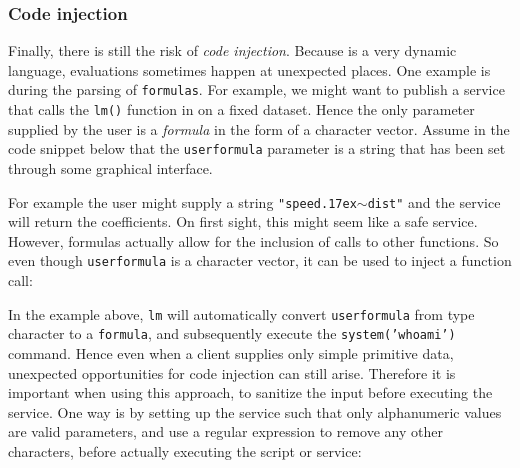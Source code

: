 \subsubsection{Code injection}

Finally, there is still the risk of \emph{code injection}. Because \R is a very
dynamic language, evaluations sometimes happen at unexpected places. One example
is during the parsing of \texttt{formulas}. For example, we might want to
publish a service that calls the \texttt{lm()} function in \R on a fixed
dataset. Hence the only parameter supplied by the user is a \emph{formula} in
the form of a character vector. Assume in the code snippet below that the
 \texttt{userformula} parameter is a string that has been set through some
graphical interface.

\begin{knitrout}\mycodesize
{}\color{fgcolor}\begin{kframe}
\begin{alltt}
\hlstd{(}  
\end{alltt}
\end{kframe}
\end{knitrout}


For example the user might supply a string
\texttt{"speed{\raise.17ex\hbox{$\scriptstyle\sim$}}dist"} and the service
will return the coefficients. On first sight, this might seem like a safe
service. However, formulas actually allow for the inclusion of calls to other
functions. So even though \texttt{userformula} is a character vector, it can be
used to inject a function call:

\begin{knitrout}\mycodesize
{}\color{fgcolor}\begin{kframe}
\begin{alltt}
 \hlkwb{<-} 
  
\end{alltt}
\end{kframe}
\end{knitrout}


In the example above, \texttt{lm} will automatically convert
\texttt{userformula} from type character to a \texttt{formula}, and subsequently
execute the \texttt{system('whoami')} command. Hence even when a client supplies
only simple primitive data, unexpected opportunities for code injection can
still arise. Therefore it is important when using this approach, to sanitize the
input before executing the service. One way is by setting up the service such
that only alphanumeric values are valid parameters, and use a regular
expression to remove any other characters, before actually executing the script
or service:

